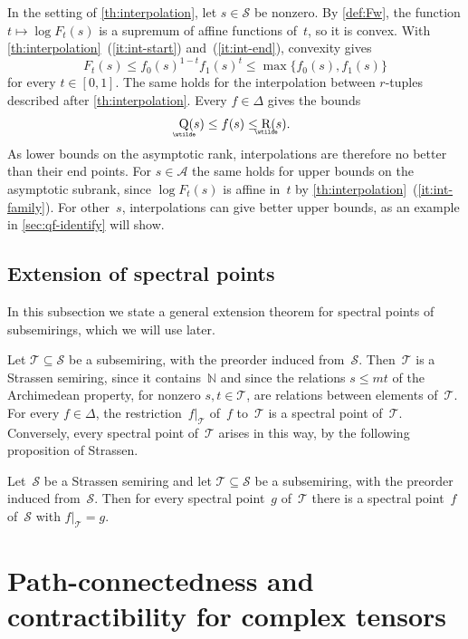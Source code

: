 \documentclass[11pt,letterpaper]{article}
\DeclareMathOperator{\asympsubrank}{\underaccent{\wtilde}{Q}}
\DeclareMathOperator{\asymprank}{\underaccent{\wtilde}{R}}
\newcommand{\NN}{\mathbb{N}}
\begin{document}
In the setting of \cref{th:interpolation}, let $s \in \mathcal{S}$ be nonzero. By \cref{def:Fw}, the function $t \mapsto \log F_t(s)$ is a supremum of affine functions of~$t$, so it is convex. With \cref{th:interpolation}~(\ref{it:int-start}) and~(\ref{it:int-end}), convexity gives
\[
F_t(s) \leq f_0(s)^{1-t} f_1(s)^t \leq \max\{f_0(s), f_1(s)\}
\]
for every $t \in [0,1]$. The same holds for the interpolation between $r$-tuples described after \cref{th:interpolation}. Every $f \in \Delta$ gives the bounds
\[
\asympsubrank(s) \leq f(s) \leq \asymprank(s).
\]
As lower bounds on the asymptotic rank, interpolations are therefore no better than their end points. For $s \in \mathcal{A}$ the same holds for upper bounds on the asymptotic subrank, since $\log F_t(s)$ is affine in~$t$ by \cref{th:interpolation}~(\ref{it:int-family}). For other~$s$, interpolations can give better upper bounds, as an example in \cref{sec:qf-identify} will show.

\subsection{Extension of spectral points}\label{sec:extension}

In this subsection we state a general extension theorem for spectral points of subsemirings, which we will use later.

Let $\mathcal{T} \subseteq \mathcal{S}$ be a subsemiring, with the preorder induced from~$\mathcal{S}$. Then~$\mathcal{T}$ is a Strassen semiring, since it contains~$\NN$ and since the relations $s \leq mt$ of the Archimedean property, for nonzero $s, t \in \mathcal{T}$, are relations between elements of~$\mathcal{T}$. For every $f \in \Delta$, the restriction~$f|_{\mathcal{T}}$ of~$f$ to~$\mathcal{T}$ is a spectral point of~$\mathcal{T}$. Conversely, every spectral point of~$\mathcal{T}$ arises in this way, by the following proposition of Strassen.

\begin{proposition}\label{prop:extension}
Let~$\mathcal{S}$ be a Strassen semiring and let $\mathcal{T} \subseteq \mathcal{S}$ be a subsemiring, with the preorder induced from~$\mathcal{S}$. Then for every spectral point~$g$ of~$\mathcal{T}$ there is a spectral point~$f$ of~$\mathcal{S}$ with $f|_{\mathcal{T}} = g$.
\end{proposition}

\section{Path-connectedness and contractibility for complex tensors}\label{sec:tensors}
\end{document}
